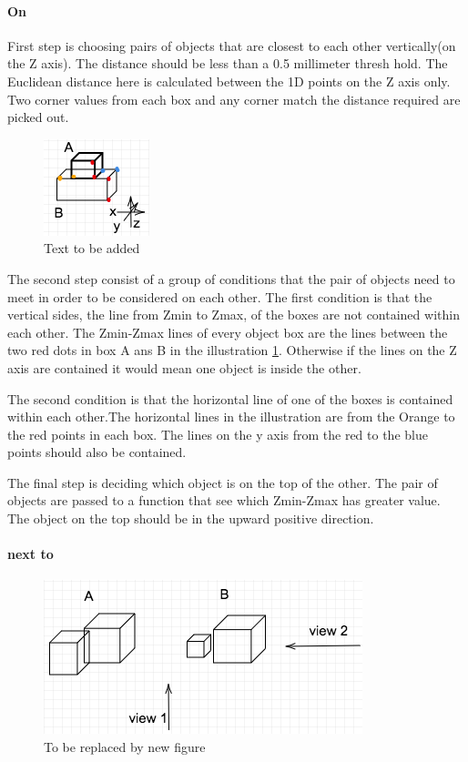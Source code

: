 \paragraph{On}



First step is choosing pairs of objects that are closest to each other vertically(on the Z axis). The distance should be less than a 0.5 millimeter thresh hold. The Euclidean distance here is calculated between the 1D points on the Z axis only. Two corner values from each box and any corner match the distance required are picked out. 

\begin{figure}[H]
\centering
\includegraphics[scale=0.7]{images/on.png}
\caption{Text to be added }
\label{fig:on}
\end{figure}


The second step consist of a group of conditions that the pair of objects need to meet in order to be considered on each other. The first condition is that the vertical sides, the line from Zmin to Zmax, of the boxes are not contained within each other. The Zmin-Zmax lines of every object box are the lines between the two red dots in box A ans B in the illustration \ref{fig:on}. Otherwise if the lines on the Z axis are contained it would mean one object is inside the other. 

The second condition is that the horizontal line of one of the boxes is contained within each other.The horizontal lines in the illustration are from the Orange to the red points in each box. The lines on the y axis from the red to the blue points should also be contained. 

The final step is deciding which object is on the top of the other. The pair of objects are passed to a function that see which Zmin-Zmax has greater value. The object on the top should be in the upward positive direction. 


\paragraph{next to}


\begin{figure}[H]
\centering
\includegraphics[scale=0.5]{images/Nextview.png}
\caption{To be replaced by new figure}
\label{fig:next}
\end{figure}


